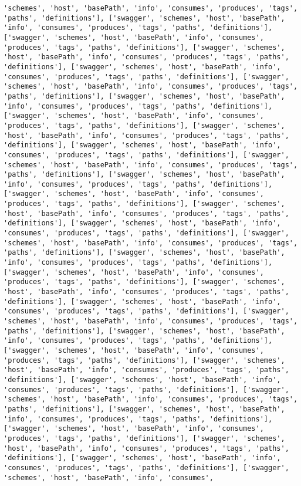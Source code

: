 \documentclass[11pt]{article}
\begin{document}
\begin{Verbatim}[commandchars=\\\{\}]
'schemes', 'host', 'basePath', 'info', 'consumes', 'produces', 'tags', 'paths', 'definitions'], ['swagger', 'schemes', 'host', 'basePath', 'info', 'consumes', 'produces', 'tags', 'paths', 'definitions'], ['swagger', 'schemes', 'host', 'basePath', 'info', 'consumes', 'produces', 'tags', 'paths', 'definitions'], ['swagger', 'schemes', 'host', 'basePath', 'info', 'consumes', 'produces', 'tags', 'paths', 'definitions'], ['swagger', 'schemes', 'host', 'basePath', 'info', 'consumes', 'produces', 'tags', 'paths', 'definitions'], ['swagger', 'schemes', 'host', 'basePath', 'info', 'consumes', 'produces', 'tags', 'paths', 'definitions'], ['swagger', 'schemes', 'host', 'basePath', 'info', 'consumes', 'produces', 'tags', 'paths', 'definitions'], ['swagger', 'schemes', 'host', 'basePath', 'info', 'consumes', 'produces', 'tags', 'paths', 'definitions'], ['swagger', 'schemes', 'host', 'basePath', 'info', 'consumes', 'produces', 'tags', 'paths', 'definitions'], ['swagger', 'schemes', 'host', 'basePath', 'info', 'consumes', 'produces', 'tags', 'paths', 'definitions'], ['swagger', 'schemes', 'host', 'basePath', 'info', 'consumes', 'produces', 'tags', 'paths', 'definitions'], ['swagger', 'schemes', 'host', 'basePath', 'info', 'consumes', 'produces', 'tags', 'paths', 'definitions'], ['swagger', 'schemes', 'host', 'basePath', 'info', 'consumes', 'produces', 'tags', 'paths', 'definitions'], ['swagger', 'schemes', 'host', 'basePath', 'info', 'consumes', 'produces', 'tags', 'paths', 'definitions'], ['swagger', 'schemes', 'host', 'basePath', 'info', 'consumes', 'produces', 'tags', 'paths', 'definitions'], ['swagger', 'schemes', 'host', 'basePath', 'info', 'consumes', 'produces', 'tags', 'paths', 'definitions'], ['swagger', 'schemes', 'host', 'basePath', 'info', 'consumes', 'produces', 'tags', 'paths', 'definitions'], ['swagger', 'schemes', 'host', 'basePath', 'info', 'consumes', 'produces', 'tags', 'paths', 'definitions'], ['swagger', 'schemes', 'host', 'basePath', 'info', 'consumes', 'produces', 'tags', 'paths', 'definitions'], ['swagger', 'schemes', 'host', 'basePath', 'info', 'consumes', 'produces', 'tags', 'paths', 'definitions'], ['swagger', 'schemes', 'host', 'basePath', 'info', 'consumes', 'produces', 'tags', 'paths', 'definitions'], ['swagger', 'schemes', 'host', 'basePath', 'info', 'consumes', 'produces', 'tags', 'paths', 'definitions'], ['swagger', 'schemes', 'host', 'basePath', 'info', 'consumes', 'produces', 'tags', 'paths', 'definitions'], ['swagger', 'schemes', 'host', 'basePath', 'info', 'consumes', 'produces', 'tags', 'paths', 'definitions'], ['swagger', 'schemes', 'host', 'basePath', 'info', 'consumes', 'produces', 'tags', 'paths', 'definitions'], ['swagger', 'schemes', 'host', 'basePath', 'info', 'consumes', 'produces', 'tags', 'paths', 'definitions'], ['swagger', 'schemes', 'host', 'basePath', 'info', 'consumes', 'produces', 'tags', 'paths', 'definitions'], ['swagger', 'schemes', 'host', 'basePath', 'info', 'consumes', 'produces', 'tags', 'paths', 'definitions'], ['swagger', 'schemes', 'host', 'basePath', 'info', 'consumes', 'produces', 'tags', 'paths', 'definitions'], ['swagger', 'schemes', 'host', 'basePath', 'info', 'consumes', 'produces', 'tags', 'paths', 'definitions'], ['swagger', 'schemes', 'host', 'basePath', 'info', 'consumes', 
\end{Verbatim}
\end{document}
